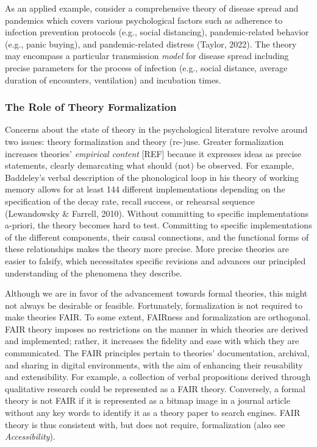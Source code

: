 \documentclass[
  man,floatsintext]{apa6}
\begin{document}
As an applied example, consider a comprehensive theory of disease spread and pandemics which covers various psychological factors
such as adherence to infection prevention protocols (e.g., social distancing),
pandemic-related behavior (e.g., panic buying),
and pandemic-related distress
(Taylor, 2022).
The theory may encompass a particular transmission \emph{model} for disease spread including precise parameters for the process of infection (e.g., social distance, average duration of encounters, ventilation) and incubation times.

\subsubsection{The Role of Theory Formalization}\label{the-role-of-theory-formalization}

Concerns about the state of theory in the psychological literature revolve around two issues: theory formalization and theory (re-)use.
Greater formalization increases theories' \emph{empirical content} {[}REF{]} because it expresses ideas as precise statements, clearly demarcating what should (not) be observed.
For example, Baddeley's verbal description of the phonological loop in his theory of working memory allows for at least 144 different implementations depending on the specification of the decay rate, recall success, or rehearsal sequence (Lewandowsky \& Farrell, 2010).
Without committing to specific implementations a-priori,
the theory becomes hard to test.
Committing to specific implementations of the different components, their causal connections, and the functional forms of these relationships makes the theory more precise.
More precise theories are easier to falsify,
which necessitates specific revisions and advances our principled understanding of the phenomena they describe.

Although we are in favor of the advancement towards formal theories,
this might not always be desirable or feasible.
Fortunately, formalization is not required to make theories FAIR.
To some extent, FAIRness and formalization are orthogonal.
FAIR theory imposes no restrictions on the manner in which theories are derived and implemented;
rather, it increases the fidelity and ease with which they are communicated.
The FAIR principles pertain to theories' documentation, archival, and sharing in digital environments, with the aim of enhancing their reusability and extensibility.
For example, a collection of verbal propositions derived through qualitative research could be represented as a FAIR theory.
Conversely, a formal theory is not FAIR if it is represented as a bitmap image in a journal article without any key words to identify it as a theory paper to search engines.
FAIR theory is thus consistent with, but does not require, formalization (also see \emph{Accessibility}).
\end{document}
